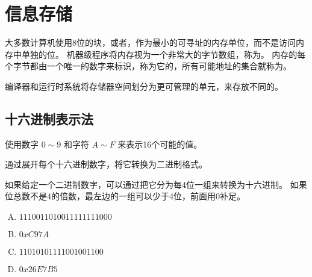 
\section{信息存储}
{
    大多数计算机使用8位的块，或者，作为最小的可寻址的内存单位，而不是访问内存中单独的位。
    机器级程序将内存视为一个非常大的字节数组，称为。
    内存的每个字节都由一个唯一的数字来标识，称为它的，所有可能地址的集合就称为。

    编译器和运行时系统将存储器空间划分为更可管理的单元，来存放不同的。

    \subsection{十六进制表示法}
    {
        使用数字 $0 \sim 9$ 和字符 $A \sim F$ 来表示16个可能的值。

        通过展开每个十六进制数字，将它转换为二进制格式。

        如果给定一个二进制数字，可以通过把它分为每4位一组来转换为十六进制。
        如果位总数不是4的倍数，最左边的一组可以少于4位，前面用0补足。

        \begin{practicec}
            \begin{enumerate}[A.]
                \item $11 1001 1010 0111 1111 1000$
                \item $0xC97A$
                \item $1101 0101 1110 0100 1100$
                \item $0x26E7B5$
            \end{enumerate}
        \end{practicec}
    }
}
